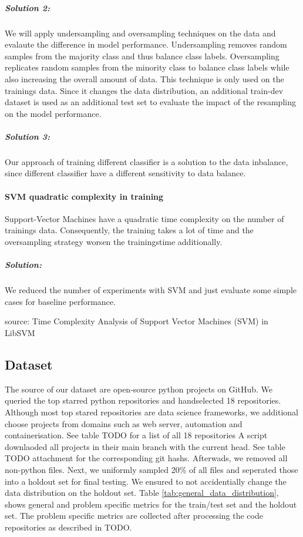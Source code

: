 \subparagraph{Solution 2:}
We will apply undersampling and oversampling techniques on the data and evalaute the difference in model performance. Undersampling removes random samples from the majority class and thus balance class labels. Oversampling replicates random samples from the minority class to balance class labels while also increasing the overall amount of data. This technique is only used on the trainings data. Since it changes the data distribution, an additional train-dev dataset is used as an additional test set to evaluate the impact of the resampling on the model performance. 

\subparagraph{Solution 3:}
Our approach of training different classifier is a solution to the data inbalance, since different classifier have a different sensitivity to data balance. 

\paragraph{SVM quadratic complexity in training}
Support-Vector Machines have a quadratic time complexity on the number of trainings data. Consequently, the training takes a lot of time and the oversampling strategy worsen the trainingstime additionally. 
\subparagraph{Solution:}
We reduced the number of experiments with SVM and just evaluate some simple cases for baseline performance. 

source: 
Time Complexity Analysis of Support Vector Machines
(SVM) in LibSVM

\subsection{Dataset}\label{chap:clean_code_classification_dataset}
The source of our dataset are open-source python projects on GitHub. We queried the top starred python repositories and handselected 18 repositories. Although most top stared repositories are data science frameworks, we additional choose projects from domains such as web server, automation and containerisation. See table TODO for a list of all 18 repositories
A script downlaoded all projects in their main branch with the current head. See table TODO attachment for the corresponding git hashs. Afterwads, we removed all non-python files. 
Next, we uniformly sampled 20\% of all files and seperated those into a holdout set for final testing. 
We ensured to not accidentially change the data distribution on the holdout set. Table \ref{tab:general_data_distribution}, shows general and problem specific metrics for the train/test set and the holdout set. The problem specific metrics are collected after processing the code repositories as described in TODO.

